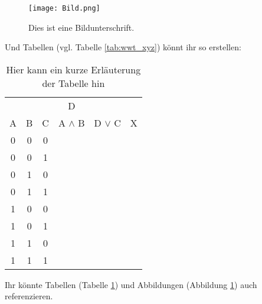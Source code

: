 \documentclass[12pt,a4paper,oneside,ngerman]{article}
\begin{document}
	\begin{figure}[H]
	    \centering
	    \texttt{[image: Bild.png]}
	    \caption{Dies ist eine Bildunterschrift. }
	    \label{fig_abbildung}
	\end{figure}

Und Tabellen (vgl. Tabelle \ref{tab:wwt_xyz}) könnt ihr so erstellen:

\begin{table}[H]
    \centering
    \begin{tabular}{c|c|c||c|c||c}
      & & & D &  & \\
    A & B & C & A $\wedge$ B  & D $\vee$ C & X \\ \hline
    0 & 0 & 0 & & &\\
    0 & 0 & 1 & & &\\
    0 & 1 & 0 & & &\\
    0 & 1 & 1 & & &\\
    1 & 0 & 0 & & &\\
    1 & 0 & 1 & & &\\
    1 & 1 & 0 & & &\\
    1 & 1 & 1 & & &\\
    \end{tabular}
    \caption{Hier kann ein kurze Erläuterung der Tabelle hin}
    \label{tab_wwt_xyz}
\end{table}	
	Ihr könnte Tabellen (Tabelle \ref{tab_wwt_xyz}) und Abbildungen (Abbildung \ref{fig_abbildung}) auch referenzieren.
\end{document}
